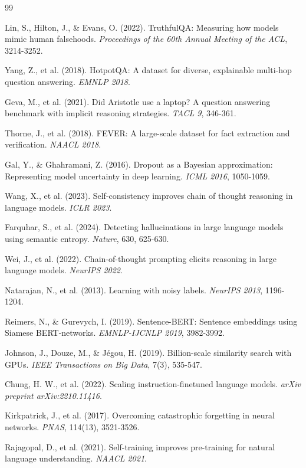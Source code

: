 \documentclass[12pt,a4paper]{article}
\theoremstyle{definition}
\begin{document}

\begin{thebibliography}{99}

Lin, S., Hilton, J., \& Evans, O. (2022).
TruthfulQA: Measuring how models mimic human falsehoods.
\textit{Proceedings of the 60th Annual Meeting of the ACL}, 3214-3252.

Yang, Z., et al. (2018).
HotpotQA: A dataset for diverse, explainable multi-hop question answering.
\textit{EMNLP 2018}.

Geva, M., et al. (2021).
Did Aristotle use a laptop? A question answering benchmark with implicit reasoning strategies.
\textit{TACL 9}, 346-361.

Thorne, J., et al. (2018).
FEVER: A large-scale dataset for fact extraction and verification.
\textit{NAACL 2018}.

Gal, Y., \& Ghahramani, Z. (2016).
Dropout as a Bayesian approximation: Representing model uncertainty in deep learning.
\textit{ICML 2016}, 1050-1059.

Wang, X., et al. (2023).
Self-consistency improves chain of thought reasoning in language models.
\textit{ICLR 2023}.

Farquhar, S., et al. (2024).
Detecting hallucinations in large language models using semantic entropy.
\textit{Nature}, 630, 625-630.

Wei, J., et al. (2022).
Chain-of-thought prompting elicits reasoning in large language models.
\textit{NeurIPS 2022}.

Natarajan, N., et al. (2013).
Learning with noisy labels.
\textit{NeurIPS 2013}, 1196-1204.

Reimers, N., \& Gurevych, I. (2019).
Sentence-BERT: Sentence embeddings using Siamese BERT-networks.
\textit{EMNLP-IJCNLP 2019}, 3982-3992.

Johnson, J., Douze, M., \& J\'{e}gou, H. (2019).
Billion-scale similarity search with GPUs.
\textit{IEEE Transactions on Big Data}, 7(3), 535-547.

Chung, H. W., et al. (2022).
Scaling instruction-finetuned language models.
\textit{arXiv preprint arXiv:2210.11416}.

Kirkpatrick, J., et al. (2017).
Overcoming catastrophic forgetting in neural networks.
\textit{PNAS}, 114(13), 3521-3526.

Rajagopal, D., et al. (2021).
Self-training improves pre-training for natural language understanding.
\textit{NAACL 2021}.

\end{thebibliography}
\end{document}
